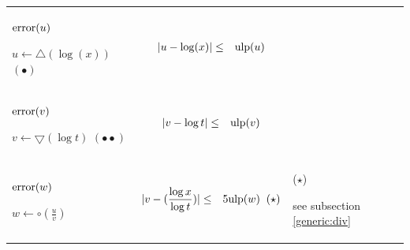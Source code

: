 \documentclass[12pt]{amsart}
\def\pinf{\bigtriangleup}
\def\minf{\bigtriangledown}
\def\ulp{{\rm ulp}}
\begin{document}
\begin{center}
\begin{tabular}{l l l}

\begin{minipage}{2.5cm}


${\textnormal{error}}(u)$


$u \leftarrow \pinf(\log(x))$
$(\bullet)$
\end{minipage} &
\begin{minipage}{7.5cm}

\begin{eqnarray}\nonumber
  |u-\log(x)| &\leq& \ulp(u)
\end{eqnarray}

\end{minipage} &
\begin{minipage}{6cm}

\end{minipage}\\%
\begin{minipage}{2.5cm}
${\textnormal{error}}(v)$


$v \leftarrow \minf(\log{t}) $
$(\bullet\bullet)$
\end{minipage} &
\begin{minipage}{7.5cm}

\begin{eqnarray}\nonumber
  |v-{\log t}| &\leq& \ulp(v)
\end{eqnarray}

\end{minipage} &
\begin{minipage}{6cm}
\end{minipage}\\%
\begin{minipage}{2.5cm}
${\textnormal{error}}(w)$


$w \leftarrow \circ(\frac{u}{v}) $

\end{minipage} &
\begin{minipage}{7.5cm}

\begin{eqnarray}\nonumber
  |v-(\frac{\log x}{\log t})| &\leq& 5 \ulp(w) \;\;(\star)
\end{eqnarray}


\end{minipage} &
\begin{minipage}{6cm}
($\star$)

see subsection \ref{generic:div}

\end{minipage}

\end{tabular}
\end{center}
\end{document}
